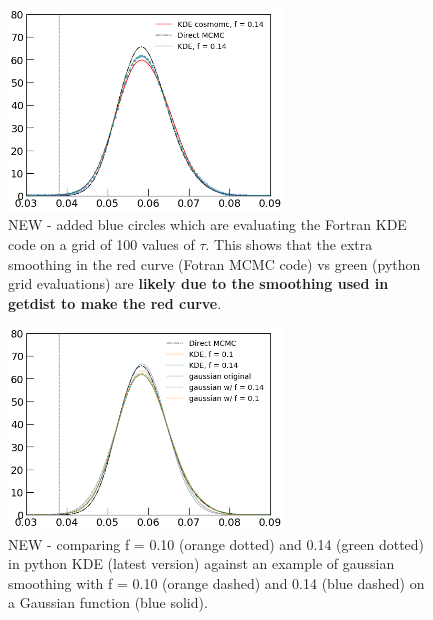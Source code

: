 \documentclass[prd,amsmath,amssymb,floatfix,superscriptaddress,nofootinbib]{revtex4-1}
\begin{document}
\begin{figure}
\includegraphics[width=0.65\textwidth]{cosmomc_kde/pl18_relike_tanh_tau_dz0p5_1D_direct_vs_fortran_and_python_kde_with_grid_test.png}
\caption{NEW - added blue circles which are evaluating the Fortran KDE code on a grid of 100 values of $\tau$. This shows that the extra smoothing in the red curve (Fotran MCMC code) vs green (python grid evaluations) are \textbf{likely due to the smoothing used in getdist to make the red curve}.
}
\label{fig:}
\end{figure}


\begin{figure}
\includegraphics[width=0.65\textwidth]{cosmomc_kde/pl18_relike_tanh_tau_dz0p5_1D_direct_vs_fortran_vs_mock_gaussian_fp10_fp14.png}
\caption{NEW - comparing f = 0.10 (orange dotted) and 0.14 (green dotted) in python KDE (latest version) against an example of gaussian smoothing with f = 0.10 (orange dashed) and 0.14 (blue dashed) on a Gaussian function (blue solid).
}
\label{fig:}
\end{figure}
\end{document}
